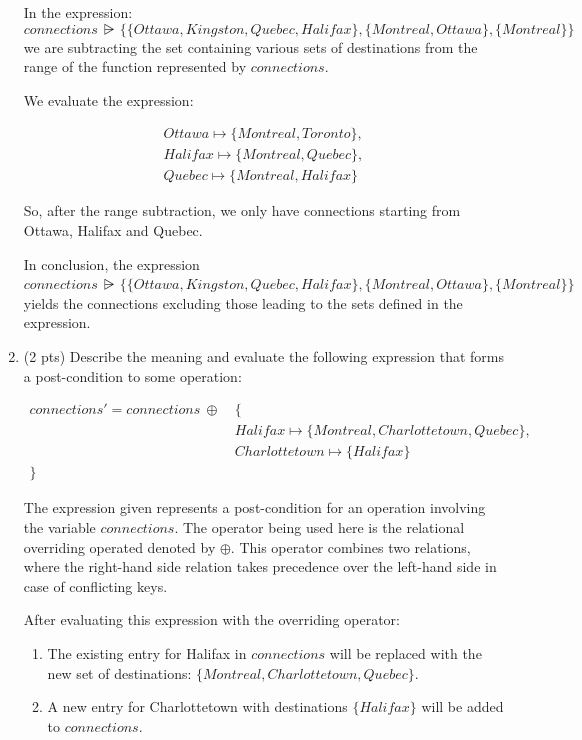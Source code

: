 \documentclass[12pt]{article}
\begin{document}
\begin{spacing}{1.5}
\begin{enumerate}
		      In the expression: 
              $$connections \: \rsub \: \{\{Ottawa, Kingston, Quebec, Halifax\},\{Montreal, Ottawa\},\{Montreal\}\}$$ 
              we are subtracting the set containing various sets of destinations from the range of the function represented by $connections$.
		      
		      We evaluate the expression:
		      
		      \begin{align*}
		      	Ottawa \mapsto \{Montreal, Toronto\}, \\
		      	Halifax \mapsto \{Montreal, Quebec\}, \\
		      	Quebec \mapsto \{Montreal, Halifax\}  
		      \end{align*}
		      
		      So, after the range subtraction, we only have connections starting from Ottawa, Halifax and Quebec.
		      
		      In conclusion, the expression $connections \: \rsub \: \{\{Ottawa, Kingston, Quebec, Halifax\},\{Montreal, Ottawa\},\{Montreal\}\}$ yields the connections excluding those leading to the sets defined in the expression.
		      
		\item (2 pts) Describe the meaning and evaluate the following expression that forms a post-condition to some operation:
		      
		      \begin{align*}connections'=connections \: \oplus \: & \{  \\
		      	            & Halifax \mapsto \{Montreal, Charlottetown, Quebec\},    \\
		      	            & Charlottetown \mapsto \{Halifax\}                       \\
		      	\}          & \end{align*}                                            \newline
		      	
		      	The expression given represents a post-condition for an operation involving the variable $connections$. The operator being used here is the relational overriding operated denoted by $\oplus$. This operator combines two relations, where the right-hand side relation takes precedence over the left-hand side in case of conflicting keys.
		      	
		      	After evaluating this expression with the overriding operator:
		      	
		      	\begin{enumerate}
		      	\item The existing entry for Halifax in $connections$ will be replaced with the new set of destinations: $\{Montreal, Charlottetown, Quebec\}$.
		      	\item A new entry for Charlottetown with destinations $\{Halifax\}$ will be added to $connections$.
		      	\end{enumerate}
		      	

\end{enumerate}
\end{spacing}
\end{document}
